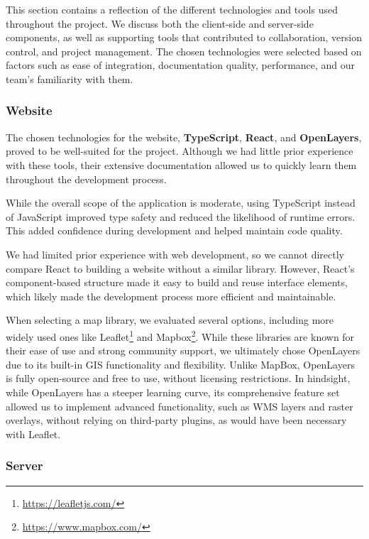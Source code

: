 This section contains a reflection of the different technologies and tools used throughout the project. We discuss both the client-side and server-side components, as well as supporting tools that contributed to collaboration, version control, and project management. The chosen technologies were selected based on factors such as ease of integration, documentation quality, performance, and our team's familiarity with them.

\subsubsection{Website}

The chosen technologies for the website, \textbf{TypeScript}, \textbf{React}, and \textbf{OpenLayers}, proved to be well-suited for the project. Although we had little prior experience with these tools, their extensive documentation allowed us to quickly learn them throughout the development process.

While the overall scope of the application is moderate, using TypeScript instead of JavaScript improved type safety and reduced the likelihood of runtime errors. This added confidence during development and helped maintain code quality.

We had limited prior experience with web development, so we cannot directly compare React to building a website without a similar library. However, React's component-based structure made it easy to build and reuse interface elements, which likely made the development process more efficient and maintainable.

When selecting a map library, we evaluated several options, including more widely used ones like Leaflet\footnote{\url{https://leafletjs.com/}} and Mapbox\footnote{\url{https://www.mapbox.com/}}. While these libraries are known for their ease of use and strong community support, we ultimately chose OpenLayers due to its built-in GIS functionality and flexibility. Unlike MapBox, OpenLayers is fully open-source and free to use, without licensing restrictions. In hindsight, while OpenLayers has a steeper learning curve, its comprehensive feature set allowed us to implement advanced functionality, such as WMS layers and raster overlays, without relying on third-party plugins, as would have been necessary with Leaflet.

\subsubsection{Server}

